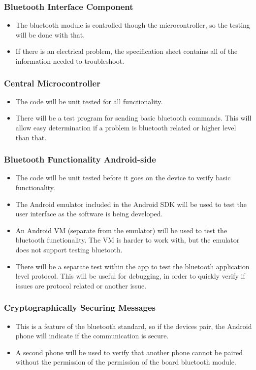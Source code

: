 \documentclass[12pt,letterpaper]{article}
\begin{document}
\subsubsection{Bluetooth Interface Component}
\begin{itemize}
\item The bluetooth module is controlled though the microcontroller, so the testing will be done with that.
\item If there is an electrical problem, the specification sheet contains all of the information needed to troubleshoot.
\end{itemize}

\subsubsection{Central Microcontroller}
\begin{itemize}
\item The code will be unit tested for all functionality.
\item There will be a test program for sending basic bluetooth commands. This will allow easy determination if a problem is bluetooth related or higher level than that.
\end{itemize}

\subsubsection{Bluetooth Functionality Android-side}
\begin{itemize}
\item The code will be unit tested before it goes on the device to verify basic functionality.
\item The Android emulator included in the Android SDK will be used to test the user interface as the software is being developed. 
\item An Android VM (separate from the emulator) will be used to test the bluetooth functionality. The VM is harder to work with, but the emulator does not support testing bluetooth. 
\item There will be a separate test within the app to test the bluetooth application level protocol. This will be useful for debugging, in order to quickly verify if issues are protocol related or another issue. 
\end{itemize}

\subsubsection{Cryptographically Securing Messages}
\begin{itemize}
\item This is a feature of the bluetooth standard, so if the devices pair, the Android phone will indicate if the communication is secure. 
\item A second phone will be used to verify that another phone cannot be paired without the permission of the permission of the board bluetooth module.
\end{itemize}
\end{document}
